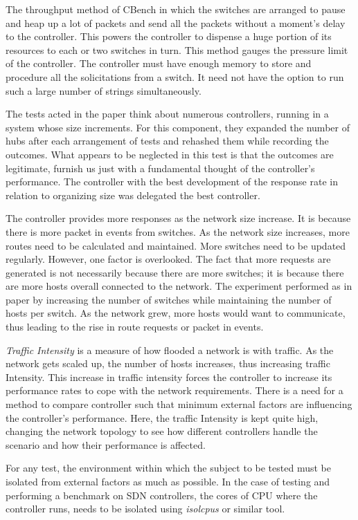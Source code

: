    The throughput method of CBench in which the switches are arranged to pause and heap up a lot of packets and send all the packets without a moment's delay to the controller. This powers the controller to dispense a huge portion of its resources to each or two switches in turn. This method gauges the pressure limit of the controller. The controller must have enough memory to store and procedure all the solicitations from a switch. It need not have the option to run such a large number of strings simultaneously.

        The tests acted in the paper \cite{dynamicrouting} think about numerous controllers, running in a system whose size increments. For this component, they expanded the number of hubs after each arrangement of tests and rehashed them while recording the outcomes. What appears to be neglected in this test is that the outcomes are legitimate, furnish us just with a fundamental thought of the controller's performance. The controller with the best development of the response rate in relation to organizing size was delegated the best controller.
        
    The controller provides more responses as the network size increase. It is because there is more packet in events from switches. As the network size increases, more routes need to be calculated and maintained. More switches need to be updated regularly. However, one factor is overlooked. The fact that more requests are generated is not necessarily because there are more switches; it is because there are more hosts overall connected to the network. The experiment performed as in paper \cite{routingtie2017} by increasing the number of switches while maintaining the number of hosts per switch. As the network grew, more hosts would want to communicate, thus leading to the rise in route requests or packet in events.
    
    \textit{Traffic Intensity} is a measure of how flooded a network is with traffic. As the network gets scaled up, the number of hosts increases, thus increasing traffic Intensity. This increase in traffic intensity forces the controller to increase its performance rates to cope with the network requirements. There is a need for a method to compare controller such that minimum external factors are influencing the controller's performance. Here, the traffic Intensity is kept quite high, changing the network topology to see how different controllers handle the scenario and how their performance is affected.

    For any test, the environment within which the subject to be tested must be isolated from external factors as much as possible. In the case of testing and performing a benchmark on SDN controllers, the cores of CPU where the controller runs, needs to be isolated using \textit{isolcpus} or similar tool.